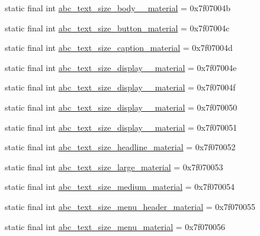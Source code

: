 \begin{CompactItemize}
\item 
static final int \hyperlink{classcom_1_1companyname_1_1x__2doo_1_1_r_1_1dimen_078d90be7e0ee97d07f1c7227d5383ab}{abc\_\-text\_\-size\_\-body\_\_\-material} = 0x7f07004b
\item 
static final int \hyperlink{classcom_1_1companyname_1_1x__2doo_1_1_r_1_1dimen_b6b2ce76e8f60a85fbf084572a2d2352}{abc\_\-text\_\-size\_\-button\_\-material} = 0x7f07004c
\item 
static final int \hyperlink{classcom_1_1companyname_1_1x__2doo_1_1_r_1_1dimen_96e14b8261839fc3fecc4c92edebe9ce}{abc\_\-text\_\-size\_\-caption\_\-material} = 0x7f07004d
\item 
static final int \hyperlink{classcom_1_1companyname_1_1x__2doo_1_1_r_1_1dimen_e87fdaaaa3cfb5b7557004fa1734ec53}{abc\_\-text\_\-size\_\-display\_\_\-material} = 0x7f07004e
\item 
static final int \hyperlink{classcom_1_1companyname_1_1x__2doo_1_1_r_1_1dimen_503061b0933fac3cacad57a1a9abbe4e}{abc\_\-text\_\-size\_\-display\_\_\-material} = 0x7f07004f
\item 
static final int \hyperlink{classcom_1_1companyname_1_1x__2doo_1_1_r_1_1dimen_f115faf968383bb52b60d102e785b8c4}{abc\_\-text\_\-size\_\-display\_\_\-material} = 0x7f070050
\item 
static final int \hyperlink{classcom_1_1companyname_1_1x__2doo_1_1_r_1_1dimen_22cf4b71bfd964ffeabaf5ac18466472}{abc\_\-text\_\-size\_\-display\_\_\-material} = 0x7f070051
\item 
static final int \hyperlink{classcom_1_1companyname_1_1x__2doo_1_1_r_1_1dimen_0ece878e7b23215d01428ae731900f6a}{abc\_\-text\_\-size\_\-headline\_\-material} = 0x7f070052
\item 
static final int \hyperlink{classcom_1_1companyname_1_1x__2doo_1_1_r_1_1dimen_36150ecbf92ab787cf6cdf84987eff03}{abc\_\-text\_\-size\_\-large\_\-material} = 0x7f070053
\item 
static final int \hyperlink{classcom_1_1companyname_1_1x__2doo_1_1_r_1_1dimen_776bc6e40d99d66f2136d26694f1a71a}{abc\_\-text\_\-size\_\-medium\_\-material} = 0x7f070054
\item 
static final int \hyperlink{classcom_1_1companyname_1_1x__2doo_1_1_r_1_1dimen_023a9e176822a6e1b89cbf98f964239a}{abc\_\-text\_\-size\_\-menu\_\-header\_\-material} = 0x7f070055
\item 
static final int \hyperlink{classcom_1_1companyname_1_1x__2doo_1_1_r_1_1dimen_db65cf18d02b8e0a31616dd40747e7e8}{abc\_\-text\_\-size\_\-menu\_\-material} = 0x7f070056

\end{CompactItemize}
